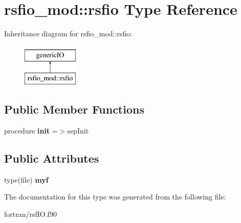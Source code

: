 \hypertarget{structrsfio__mod_1_1rsfio}{}\section{rsfio\+\_\+mod\+:\+:rsfio Type Reference}
\label{structrsfio__mod_1_1rsfio}
Inheritance diagram for rsfio\+\_\+mod\+:\+:rsfio\+:\begin{figure}[H]
\begin{center}
\leavevmode
\includegraphics[height=2.000000cm]{structrsfio__mod_1_1rsfio}
\end{center}
\end{figure}
\subsection*{Public Member Functions}
\begin{DoxyCompactItemize}
\item 
\mbox{\label{structrsfio__mod_1_1rsfio_add0530e9ca9d85721380656752486c4d}} 
procedure {\bfseries init} =$>$sep\+Init
\end{DoxyCompactItemize}
\subsection*{Public Attributes}
\begin{DoxyCompactItemize}
\item 
\mbox{\label{structrsfio__mod_1_1rsfio_ab162b5fcedbe6f3d41a554cdccce790c}} 
type(file) {\bfseries myf}
\end{DoxyCompactItemize}


The documentation for this type was generated from the following file\+:\begin{DoxyCompactItemize}
\item 
fortran/rsf\+I\+O.\+f90\end{DoxyCompactItemize}
